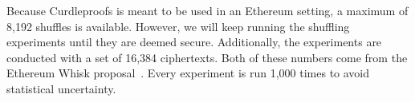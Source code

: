 Because Curdleproofs is meant to be used in an Ethereum setting, a maximum of 8,192 shuffles is available.
However, we will keep running the shuffling experiments until they are deemed secure.
Additionally, the experiments are conducted with a set of 16,384 ciphertexts.
Both of these numbers come from the Ethereum Whisk proposal~\cite{Whisk2024}.
Every experiment is run 1,000 times to avoid statistical uncertainty.